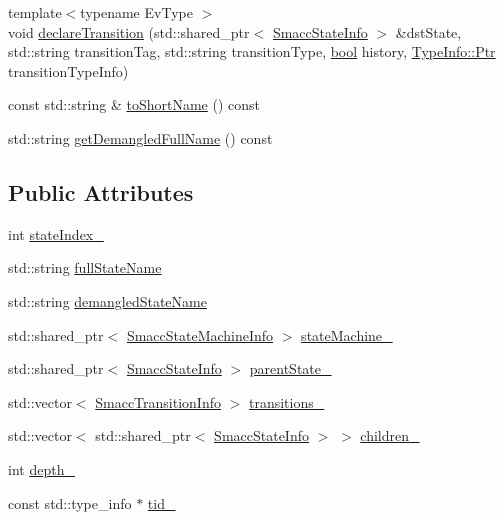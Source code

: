 \begin{DoxyCompactItemize}
{\footnotesize template$<$typename Ev\+Type $>$ }\\void \hyperlink{classsmacc_1_1introspection_1_1SmaccStateInfo_ac0b32e5504ccbed161ad50f0b77c2004}{declare\+Transition} (std\+::shared\+\_\+ptr$<$ \hyperlink{classsmacc_1_1introspection_1_1SmaccStateInfo}{Smacc\+State\+Info} $>$ \&dst\+State, std\+::string transition\+Tag, std\+::string transition\+Type, \hyperlink{classbool}{bool} history, \hyperlink{classsmacc_1_1introspection_1_1TypeInfo_aa6ffd9c39811d59f7c771941b7fad860}{Type\+Info\+::\+Ptr} transition\+Type\+Info)
\item 
const std\+::string \& \hyperlink{classsmacc_1_1introspection_1_1SmaccStateInfo_aa43c3733427618a141c3f6803913a88b}{to\+Short\+Name} () const 
\item 
std\+::string \hyperlink{classsmacc_1_1introspection_1_1SmaccStateInfo_a84e7951d11da45516080103959b88c17}{get\+Demangled\+Full\+Name} () const 
\end{DoxyCompactItemize}
\subsection*{Public Attributes}
\begin{DoxyCompactItemize}
\item 
int \hyperlink{classsmacc_1_1introspection_1_1SmaccStateInfo_a2354fa7abf158f0c29ab71c3125c9801}{state\+Index\+\_\+}
\item 
std\+::string \hyperlink{classsmacc_1_1introspection_1_1SmaccStateInfo_aef6053863f757bf9af16fe4da75c51de}{full\+State\+Name}
\item 
std\+::string \hyperlink{classsmacc_1_1introspection_1_1SmaccStateInfo_acf0014a819c23caad085ba6df13a17bf}{demangled\+State\+Name}
\item 
std\+::shared\+\_\+ptr$<$ \hyperlink{classsmacc_1_1introspection_1_1SmaccStateMachineInfo}{Smacc\+State\+Machine\+Info} $>$ \hyperlink{classsmacc_1_1introspection_1_1SmaccStateInfo_a74685e4540842ee292a80a1db44818bb}{state\+Machine\+\_\+}
\item 
std\+::shared\+\_\+ptr$<$ \hyperlink{classsmacc_1_1introspection_1_1SmaccStateInfo}{Smacc\+State\+Info} $>$ \hyperlink{classsmacc_1_1introspection_1_1SmaccStateInfo_afa49a141d2ccdb3d6f9676ed380ce006}{parent\+State\+\_\+}
\item 
std\+::vector$<$ \hyperlink{structsmacc_1_1introspection_1_1SmaccTransitionInfo}{Smacc\+Transition\+Info} $>$ \hyperlink{classsmacc_1_1introspection_1_1SmaccStateInfo_ae8b5d8e409e377ef9a88d92fb31a8446}{transitions\+\_\+}
\item 
std\+::vector$<$ std\+::shared\+\_\+ptr$<$ \hyperlink{classsmacc_1_1introspection_1_1SmaccStateInfo}{Smacc\+State\+Info} $>$ $>$ \hyperlink{classsmacc_1_1introspection_1_1SmaccStateInfo_a73eac049e8149b6eaeec735101c32ef9}{children\+\_\+}
\item 
int \hyperlink{classsmacc_1_1introspection_1_1SmaccStateInfo_a7e97a482ca49057f27e638268d1a3189}{depth\+\_\+}
\item 
const std\+::type\+\_\+info $\ast$ \hyperlink{classsmacc_1_1introspection_1_1SmaccStateInfo_a37d0d0bce171b57b8d3a39f44ab45248}{tid\+\_\+}
\end{DoxyCompactItemize}
